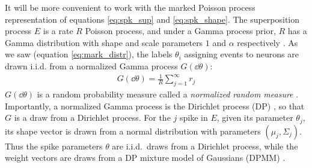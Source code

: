 It will be more convenient to work with the marked Poisson process representation of equations \ref{eq:spk_sup} and \ref{eq:spk_shape}. 
The superposition process $E$ is a rate $R$ Poisson process,
and under a Gamma process prior, $R$ has a Gamma distribution with shape and scale parameters $1$ and $\alpha$ respectively \citep{Ferguson73}.
As we saw (equation \eqref{eq:mark_distr}), the labels $\theta_i$ assigning events to neurons are drawn i.i.d. from a normalized Gamma 
process $G(\dd \theta)$:
\begin{align}
 G(\dd \theta) = \frac{1}{R} \sum_{j=1}^{\infty} r_j
\end{align}
$G(\dd \theta)$ is a random probability measure called a \emph{normalized random measure} \citep{JamesLP09}. Importantly, a 
normalized Gamma process is the Dirichlet process (DP) \citep{Ferguson73}, so that $G$ is a draw from a Dirichlet process. For the $j$ spike in $E$, given its 
parameter $\theta_j$, its shape vector is drawn from a normal distribution
with parameters $(\mu_{j}, \Sigma_{j})$. Thus the spike parameters $\theta$ are i.i.d.\ draws from a Dirichlet process, while the weight vectors are
draws from a DP mixture model of Gaussians (DPMM) \citep{Lo1984}.

